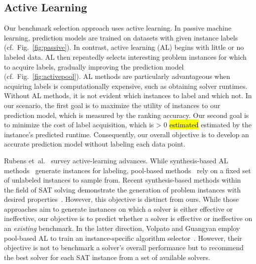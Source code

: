 \documentclass[sn-basic, Numbered]{sn-jnl} %
\newcommand{\showchanges}{1} %
\newcommand{\change}[1]{\ifnum \showchanges > 0 \sethlcolor{yellow}\hl{#1} \else #1 \fi}
\begin{document}
\subsection{Active Learning}
\label{sec:related:active-learning}

Our benchmark selection approach uses active learning.
In passive machine learning, prediction models are trained on datasets with given instance labels (cf.~Fig.~\ref{fig:passive}).
In contrast, active learning (AL) begins with little or no labeled data.
AL then repeatedly selects interesting problem instances for which to acquire labels, gradually improving the prediction model (cf.~Fig.~\ref{fig:activepool}).
AL methods are particularly advantageous when acquiring labels is computationally expensive, such as obtaining solver runtimes.
Without AL methods, it is not evident which instances to label and which not.
In our scenario, the first goal is to maximize the utility of instances to our prediction model, which is measured by the ranking accuracy.
Our second goal is to minimize the cost of label acquisition, which is \change{estimated} by the instance's predicted runtime.
Consequently, our overall objective is to develop an accurate prediction model without labeling each data point.

Rubens et~al.~\cite{RubensESK15} survey active-learning advances.
While synthesis-based AL methods~\cite{0001AEMN22,GarzonMG22,2019gaal} generate instances for labeling, pool-based methods~\cite{GolbandiKL11,HarpaleY08,KorenBV09} rely on a fixed set of unlabeled instances to sample from.
Recent synthesis-based methods within the field of SAT solving demonstrate the generation of problem instances with desired properties~\cite{0001AEMN22,GarzonMG22}.
However, this objective is distinct from ours.
While those approaches aim to generate instances on which a solver is either effective or ineffective, our objective is to predict whether a solver is effective or ineffective on an \emph{existing} benchmark.
In the latter direction, Volpato and Guangyan employ pool-based AL to train an instance-specific algorithm selector~\cite{volpato2019active}.
However, their objective is not to benchmark a solver's overall performance but to recommend the best solver for each SAT instance from a set of available solvers.
\end{document}
